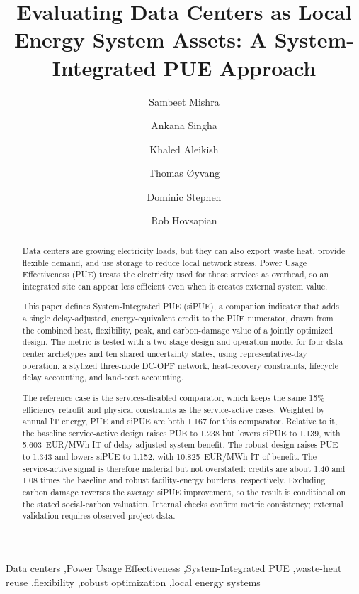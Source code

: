 \documentclass[preprint,12pt]{elsarticle}
\begin{document}
\begin{frontmatter}


\title{Evaluating Data Centers as Local Energy System Assets: A System-Integrated PUE Approach}

\author[usn]{Sambeet Mishra}
\author[usn]{Ankana Singha}
\author[usn]{Khaled Aleikish}
\author[usn]{Thomas {\O}yvang}
\author[bax]{Dominic Stephen}
\author[srnl]{Rob Hovsapian}

\address[usn]{University of South-Eastern Norway, Porsgrunn, Norway}
\address[bax]{Bax Innovation, Barcelona, Spain}
\address[srnl]{Savannah River National Laboratory, USA}


\begin{abstract}
Data centers are growing electricity loads, but they can also export waste heat, provide flexible demand, and use storage to reduce local network stress. Power Usage Effectiveness (PUE) treats the electricity used for those services as overhead, so an integrated site can appear less efficient even when it creates external system value.

This paper defines System-Integrated PUE (siPUE), a companion indicator that adds a single delay-adjusted, energy-equivalent credit to the PUE numerator, drawn from the combined heat, flexibility, peak, and carbon-damage value of a jointly optimized design. The metric is tested with a two-stage design and operation model for four data-center archetypes and ten shared uncertainty states, using representative-day operation, a stylized three-node DC-OPF network, heat-recovery constraints, lifecycle delay accounting, and land-cost accounting.

The reference case is the services-disabled comparator, which keeps the same 15\% efficiency retrofit and physical constraints as the service-active cases. Weighted by annual IT energy, PUE and siPUE are both 1.167 for this comparator. Relative to it, the baseline service-active design raises PUE to 1.238 but lowers siPUE to 1.139, with 5.603~EUR/MWh IT of delay-adjusted system benefit. The robust design raises PUE to 1.343 and lowers siPUE to 1.152, with 10.825~EUR/MWh IT of benefit. The service-active signal is therefore material but not overstated: credits are about 1.40 and 1.08 times the baseline and robust facility-energy burdens, respectively. Excluding carbon damage reverses the average siPUE improvement, so the result is conditional on the stated social-carbon valuation. Internal checks confirm metric consistency; external validation requires observed project data.
\end{abstract}

\begin{keyword}
Data centers \sep Power Usage Effectiveness \sep System-Integrated PUE \sep waste-heat reuse \sep flexibility \sep robust optimization \sep local energy systems

\end{keyword}

\end{frontmatter}
\end{document}
